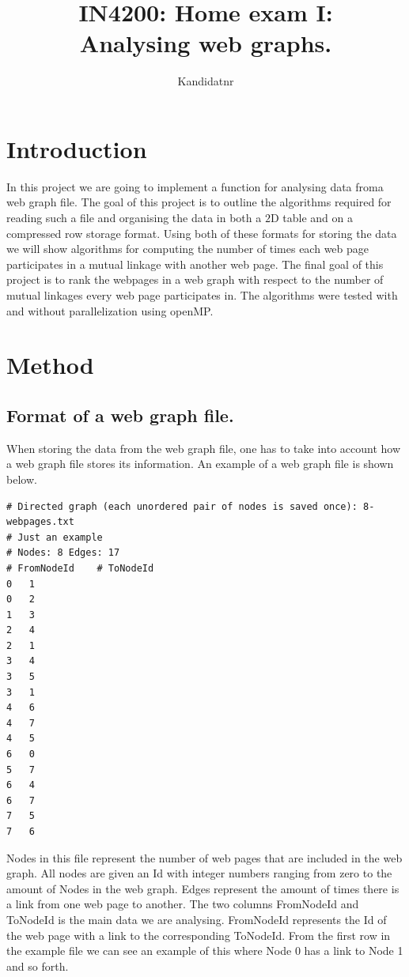 \documentclass[onecolumn]{aastex62}
\begin{document}
\title{\Large IN4200: Home exam I:\\Analysing web graphs.}



\author{Kandidatnr}



\section{Introduction} \label{sec:intro}
In this project we are going to implement a function for analysing data froma web graph file. The goal of this project is to outline the algorithms required for reading such a file and organising the data in both a $2$D table and on a compressed row storage format. Using both of these formats for storing the data we will show algorithms for computing the number of times each web page participates in a mutual linkage with another web page. The final goal of this project is to rank the webpages in a web graph with respect to the number of mutual linkages every web page participates in. The algorithms were tested with and without parallelization using openMP.
 
\section{Method} \label{sec:method}
\subsection{Format of a web graph file.}\label{sec:web}
When storing the data from the web graph file, one has to take into account how a web graph file stores its information. An example of a web graph file is shown below.
\begin{lstlisting}
# Directed graph (each unordered pair of nodes is saved once): 8-webpages.txt 
# Just an example
# Nodes: 8 Edges: 17
# FromNodeId    # ToNodeId
0   1
0   2
1   3
2   4
2   1
3   4
3   5
3   1
4   6
4   7
4   5
6   0
5   7
6   4
6   7
7   5
7   6
\end{lstlisting}
Nodes in this file represent the number of web pages that are included in the web graph. All nodes are given an Id with integer numbers ranging from zero to the amount of Nodes in the web graph. Edges represent the amount of times there is a link from one web page to another. The two columns FromNodeId and ToNodeId is the main data we are analysing. FromNodeId represents the Id of the web page with a link to the corresponding ToNodeId. From the first row in the example file we can see an example of this where Node 0 has a link to Node 1 and so forth.
\end{document}
